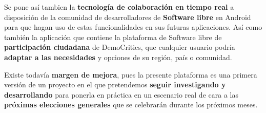 Se pone así tambien la \textbf{tecnología de colaboración en tiempo real} a disposición de la comunidad de desarrolladores de \textbf{Software libre} en Android para que hagan uso de estas funcionalidades en sus futuras aplicaciones. Así como también la aplicación que contiene la plataforma de Software libre de \textbf{participación ciudadana} de DemoCritics, que cualquier usuario podría \textbf{adaptar a las necesidades} y opciones de su región, país o comunidad.

Existe todavía \textbf{margen de mejora}, pues la presente plataforma es una primera versión de un proyecto en el que pretendemos \textbf{seguir investigando y desarrollando} para ponerla en práctica en un escenario real de cara a las \textbf{próximas elecciones generales} que se celebrarán durante los próximos meses.


